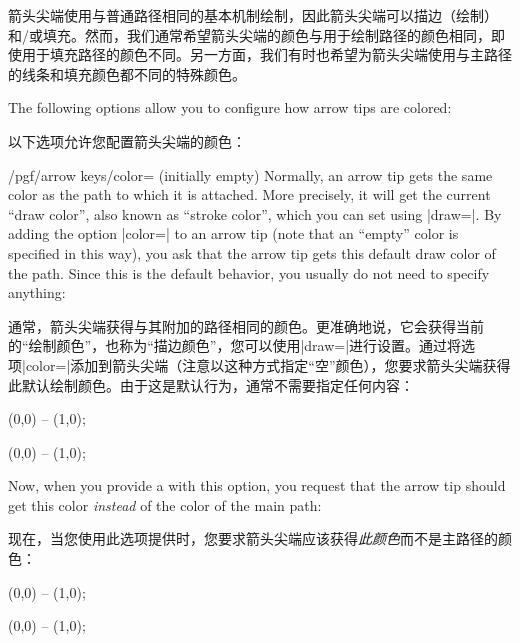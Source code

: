箭头尖端使用与普通路径相同的基本机制绘制，因此箭头尖端可以描边（绘制）和/或填充。然而，我们通常希望箭头尖端的颜色与用于绘制路径的颜色相同，即使用于填充路径的颜色不同。另一方面，我们有时也希望为箭头尖端使用与主路径的线条和填充颜色都不同的特殊颜色。

The following options allow you to configure how arrow tips are colored:

以下选项允许您配置箭头尖端的颜色：

\begin{key}{/pgf/arrow keys/color= (initially \normalfont empty)}
    Normally, an arrow tip gets the same color as the path to which it is
    attached. More precisely, it will get the current ``draw color'', also
    known as ``stroke color'', which you can set using |draw=|. By adding the option |color=| to an arrow tip (note that an
    ``empty'' color is specified in this way), you ask that the arrow tip gets
    this default draw color of the path. Since this is the default behavior,
    you usually do not need to specify anything:

    通常，箭头尖端获得与其附加的路径相同的颜色。更准确地说，它会获得当前的“绘制颜色”，也称为“描边颜色”，您可以使用|draw=|进行设置。通过将选项|color=|添加到箭头尖端（注意以这种方式指定“空”颜色），您要求箭头尖端获得此默认绘制颜色。由于这是默认行为，通常不需要指定任何内容：

    \begin{codeexample}[width=3cm,preamble={\usetikzlibrary{arrows.meta}}]
 \draw [red, arrows = {-Stealth}] (0,0) -- (1,0);
\end{codeexample}
\begin{codeexample}[width=3cm,preamble={\usetikzlibrary{arrows.meta}}]
 \draw [blue, arrows = {-Stealth}] (0,0) -- (1,0);
\end{codeexample}

    Now, when you provide a  with this option, you request that the
    arrow tip should get this color \emph{instead} of the color of the main
    path:
    
    现在，当您使用此选项提供时，您要求箭头尖端应该获得\emph{此颜色}而不是主路径的颜色：
\begin{codeexample}[width=3cm,preamble={\usetikzlibrary{arrows.meta}}]
 \draw [red, arrows = {-Stealth[color=blue]}] (0,0) -- (1,0);
\end{codeexample}
\begin{codeexample}[width=3cm,preamble={\usetikzlibrary{arrows.meta}}]
 \draw [red, arrows = {-Stealth[color=black]}] (0,0) -- (1,0);
\end{codeexample}


\end{key}
